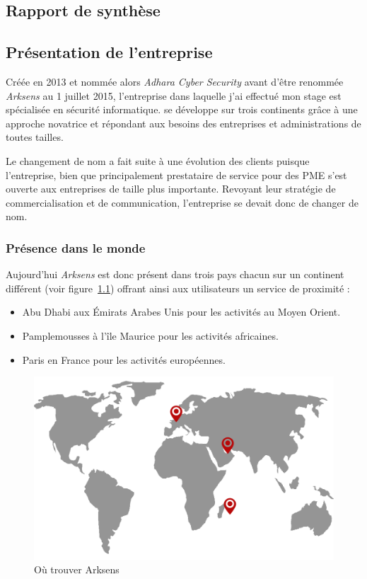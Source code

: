 \documentclass[a4paper,10pt, twoside]{report}
\begin{document}
\begin{spacing}{1.2}
\chapter{Rapport de synth\`ese}
\thispagestyle{fancy}
\section{Pr\'esentation de l'entreprise}
Cr\'e\'ee en 2013 et nomm\'ee alors \textit{Adhara Cyber Security} avant
d'\^etre renomm\'ee \textit{Arksens} au 1 juillet 2015, l'entreprise 
dans laquelle j'ai effectu\'e mon stage est sp\'ecialis\'ee en s\'ecurit\'e
informatique. se d\'eveloppe sur trois continents gr\^ace \`a une approche
novatrice et r\'epondant aux besoins des entreprises et administrations de
toutes tailles.

Le changement de nom a fait suite \`a une \'evolution des clients puisque
l'entreprise, bien que principalement prestataire de service pour des PME
s'est ouverte aux entreprises de taille plus importante. Revoyant leur
strat\'egie de commercialisation et de communication, l'entreprise se devait
donc de changer de nom.

\subsection{Pr\'esence dans le monde}
Aujourd'hui \textit{Arksens} est donc pr\'esent dans trois pays chacun sur
un continent diff\'erent (voir figure~\ref{mapArksens}) offrant ainsi aux
utilisateurs un service de proximit\'e :
\begin{itemize}
  \item Abu Dhabi aux \'Emirats Arabes Unis pour les activit\'es au Moyen
  Orient.
  \item Pamplemousses à l’\^ile Maurice pour les activit\'es africaines.
  \item Paris en France pour les activit\'es européennes.
\end{itemize}

\begin{figure}[h!]
  \centering
  \includegraphics[scale=0.30]{map_arksens.png}
  \caption{\label{mapArksens} O\`u trouver Arksens}
\end{figure}
      

\end{spacing}
\end{document}
